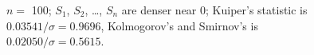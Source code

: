 \documentclass{article}
\begin{document}
\begin{figure}
\begin{centering}
\end{centering}
\caption{$n =$ 100; $S_1$, $S_2$, \dots, $S_n$ are denser near 0;
         Kuiper's statistic is $0.03541 / \sigma = 0.9696$,
         Kolmogorov's and Smirnov's is $0.02050 / \sigma = 0.5615$.}
\label{100_00}
\end{figure}



\newpage





\end{document}
